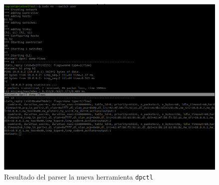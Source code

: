 \begin{figure}[ht]
    \centering
    \includegraphics[width=\textwidth]{archivos/img/dev/dpctl_6.png}
    \caption{Resultado del parser la nueva herramienta \texttt{dpctl}}
    \label{fig:dpctl_6}
\end{figure}